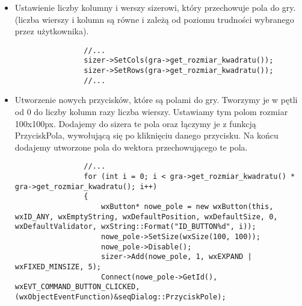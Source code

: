 \documentclass[]{report}
\begin{document}
\begin{itemize}
\begin{itemize}
			\item Ustawienie liczby kolumny i werszy sizerowi, który przechowuje pola do gry. (liczba wierszy i kolumn są równe i zależą od poziomu trudności wybranego przez użytkownika).
			\begin{lstlisting}
				//...
				sizer->SetCols(gra->get_rozmiar_kwadratu());
				sizer->SetRows(gra->get_rozmiar_kwadratu());
				//...
			\end{lstlisting}
			\item Utworzenie nowych przycisków, które są polami do gry. Tworzymy je w pętli od 0 do liczby kolumn razy liczba wierszy. Ustawiamy tym polom rozmiar 100x100px. Dodajemy do sizera te pola oraz łączymy je z funkcją PrzyciskPola, wywołującą się po kliknięciu danego przycisku. Na końcu dodajemy utworzone pola do wektora przechowującego te pola.
			\begin{lstlisting}
				//...
				for (int i = 0; i < gra->get_rozmiar_kwadratu() * gra->get_rozmiar_kwadratu(); i++)
				{
					wxButton* nowe_pole = new wxButton(this, wxID_ANY, wxEmptyString, wxDefaultPosition, wxDefaultSize, 0, wxDefaultValidator, wxString::Format("ID_BUTTON%d", i));
					nowe_pole->SetSize(wxSize(100, 100));
					nowe_pole->Disable();
					sizer->Add(nowe_pole, 1, wxEXPAND | wxFIXED_MINSIZE, 5);
					Connect(nowe_pole->GetId(), wxEVT_COMMAND_BUTTON_CLICKED, (wxObjectEventFunction)&seqDialog::PrzyciskPole);
					

\end{lstlisting}
\end{itemize}
\end{itemize}
\end{document}
